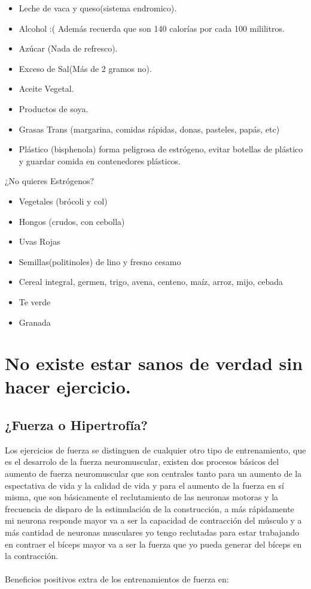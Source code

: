 \documentclass{article}
\begin{document}
\begin{itemize}
    \item Leche de vaca y queso(sistema endromico).
    \item Alcohol :( Además recuerda que son 140 calorías por cada 100 mililitros. 
    \item Azúcar (Nada de refresco).
    \item Exceso de Sal(Más de 2 gramos no).
    \item Aceite Vegetal.
    \item Productos de soya.
    \item Grasas Trans (margarina, comidas rápidas, donas, pasteles, papás, etc) 
    \item Plástico (bisphenola) forma peligrosa de estrógeno, evitar botellas de plástico y guardar comida en contenedores plásticos.
\end{itemize}

¿No quieres Estrógenos? 

\begin{itemize}
    \item Vegetales (brócoli y col)
    \item Hongos (crudos, con cebolla)
    \item Uvas Rojas
    \item Semillas(politinoles) de lino y fresno cesamo
    \item Cereal integral, germen, trigo, avena, centeno, maíz, arroz, mijo, cebada
    \item Te verde 
    \item Granada 
\end{itemize}

\section{No existe estar sanos de verdad sin hacer ejercicio.}

\subsection{¿Fuerza o Hipertrofía?}


Los ejercicios de fuerza se distinguen de cualquier otro tipo de entrenamiento, que es el desarrolo de la fuerza neuromuscular, existen dos procesos básicos del aumento de fuerza neuromuscular que son centrales tanto para un aumento de la espectativa de vida y la calidad de vida y para el aumento de la fuerza en sí misma, que son básicamente el reclutamiento de las neuronas motoras y la frecuencia de disparo de la estimulación de la construcción, a más rápidamente mi neurona responde mayor va a ser la capacidad de contracción del músculo y a más cantidad de neuronas musculares yo tengo reclutadas para estar trabajando en contraer el bíceps mayor va a ser la fuerza que yo pueda generar del bíceps en la contracción.\\
\\
Beneficios positivos extra de los entrenamientos de fuerza en:
\end{document}
